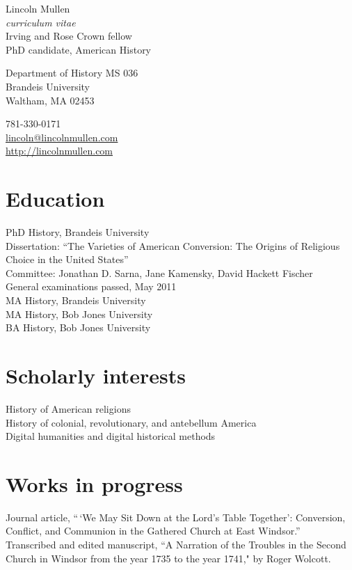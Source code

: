 \documentclass[11pt]{article}
\newcommand{\years}[1]{\marginnote{\scriptsize #1}}
\begin{document}
{\LARGE Lincoln Mullen}\\
\emph{curriculum vitae}\\[1cm]

Irving and Rose Crown fellow\\
PhD candidate, American History

\begin{multicols}{2}
Department of History MS 036\\
Brandeis University\\
Waltham, MA 02453

\columnbreak

781-330-0171\\
\href{mailto:lincoln@lincolnmullen.com}{lincoln@lincolnmullen.com}\\
\href{http://lincolnmullen.com}{http://lincolnmullen.com}
\end{multicols}


\vfill


\section*{Education}
\noindent
\years{2009--}PhD History, Brandeis University\\[.05cm]
	Dissertation: ``The Varieties of American Conversion: The Origins of Religious Choice in the United States''\\
	Committee:  Jonathan D. Sarna, Jane Kamensky, David Hackett Fischer\\
	General examinations passed, May 2011\\[.2cm]
\years{2011}MA History, Brandeis University\\
\years{2008}MA History, Bob Jones University\\
\years{2006}BA History, Bob Jones University

\section*{Scholarly interests}
History of American religions\\
History of colonial, revolutionary, and antebellum America\\
Digital humanities and digital historical methods

\section*{Works in progress}
Journal article, ``\,`We May Sit Down at the Lord's Table Together': Conversion,  Conflict, and Communion in the Gathered Church at East Windsor.''\\[.05cm]
Transcribed and edited manuscript, ``A Narration of the Troubles in the Second Church in Windsor from the year 1735 to the year 1741," by Roger Wolcott.
\end{document}
